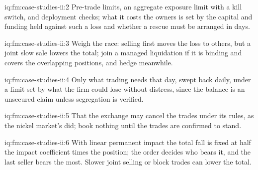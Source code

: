 \begin{solution}{iq:fm:case-studies-ii:2}
Pre-trade limits, an aggregate exposure limit with a kill switch, and deployment checks; what it costs the owners is set by the capital and funding
held against such a loss and whether a rescue must be arranged in days.
\end{solution}

\begin{solution}{iq:fm:case-studies-ii:3}
Weigh the race: selling first moves the loss to others, but a joint slow sale lowers the total; join a managed liquidation if it is binding and
covers the overlapping positions, and hedge meanwhile.
\end{solution}

\begin{solution}{iq:fm:case-studies-ii:4}
Only what trading needs that day, swept back daily, under a limit set by what the firm could lose without distress, since the balance is an
unsecured claim unless segregation is verified.
\end{solution}

\begin{solution}{iq:fm:case-studies-ii:5}
That the exchange may cancel the trades under its rules, as the nickel market's did; book nothing until the trades are confirmed to stand.
\end{solution}

\begin{solution}{iq:fm:case-studies-ii:6}
With linear permanent impact the total fall is fixed at half the impact coefficient times the position; the order decides who bears it, and the
last seller bears the most. Slower joint selling or block trades can lower the total.
\end{solution}
